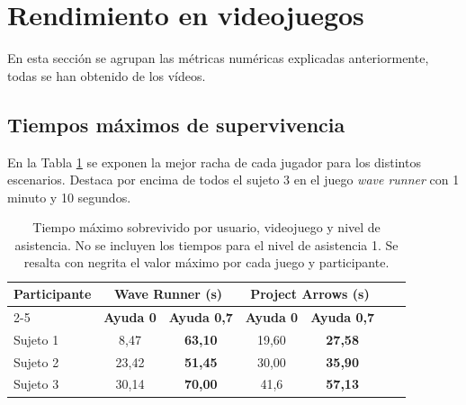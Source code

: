 \section{Rendimiento en videojuegos}
\label{sec:rt_res_videojuegos}

En esta sección se agrupan las métricas numéricas explicadas anteriormente,
todas se han obtenido de los vídeos.

\subsection{Tiempos máximos de supervivencia}

En la Tabla \ref{tab:tiempos_supervivencia} se exponen la mejor racha de cada
jugador para los distintos escenarios. Destaca por encima de todos el sujeto 3
en el juego \textit{wave runner} con 1 minuto y 10 segundos.

\begin{table}[h!]
      \centering
      \begin{tabular}{|l|c|c|c|c|c|c|}
            \hline
            \multirow{2}{*}{\textbf{Participante}} & \multicolumn{2}{c|}{\textbf{Wave Runner (s)}} & \multicolumn{2}{c|}{\textbf{Project Arrows (s)}}                                         \\ \cline{2-5}
                                                   & \textbf{Ayuda 0}                              & \textbf{Ayuda 0,7}                               & \textbf{Ayuda 0} & \textbf{Ayuda 0,7} \\ \hline
            Sujeto 1                               & 8,47                                          & \textbf{63,10}                                   & 19,60            & \textbf{27,58}     \\ \hline
            Sujeto 2                               & 23,42                                         & \textbf{51,45}                                   & 30,00            & \textbf{35,90}     \\ \hline
            Sujeto 3                               & 30,14                                         & \textbf{70,00}                                   & 41,6             & \textbf{57,13}     \\ \hline
      \end{tabular}
      \caption{Tiempo máximo sobrevivido por usuario, videojuego y nivel de asistencia. No se incluyen los tiempos para el nivel de asistencia 1. Se resalta con negrita el valor máximo por cada juego y participante.}
      \label{tab:tiempos_supervivencia}
\end{table}

